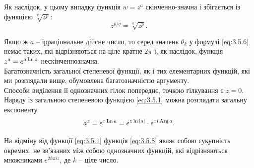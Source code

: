 Як наслідок, у цьому випадку функція $w = z^a$ скінченно-значна і збігається із функцією $\sqrt[q]{z^p}$:
\begin{equation}
	\label{eq:3.5.7}
	z^{p / q} = \sqrt[q]{z^p}.
\end{equation}

Якщо ж $a$ -- ірраціональне дійсне число, то серед значень $\theta_k$ у формулі \eqref{eq:3.5.6} немає таких, які відрізняються на ціле кратне $2 \pi$ і, як наслідок, функція $z^a = e^{a \operatorname{Ln} z}$ нескінченнозначна. \\

Багатозначність загальної степеневої функції, як і тих елементарних функцій, які ми розглядали вище, обумовлена багатозначністю аргументу. \\

Способи виділення її однозначних гілок попереднє, точкою гілкування є $z = 0$. \\

Наряду із загальною степеневою функцією \eqref{eq:3.5.1} можна розглядати загальну експоненту
\begin{equation}
	\label{eq:3.5.8}
	a^z = e^{z \operatorname{Ln} a} = e^{z \ln |a|} \cdot e^{z i \operatorname{Arg} a}.
\end{equation}

На відміну від функції \eqref{eq:3.5.1} функція \eqref{eq:3.5.8} являє собою сукупність окремих, не зв'язаних між собою однозначних функцій, які відрізняються множниками $e^{2 k \pi i z}$, де $k$ -- ціле число.


% 